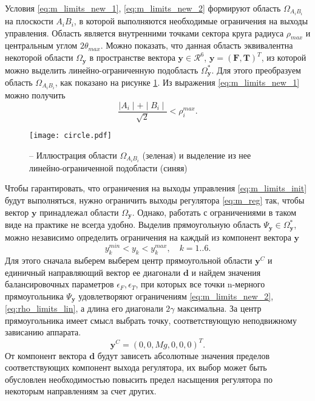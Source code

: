 Условия \eqref{eq:m_limits_new_1}, \eqref{eq:m_limits_new_2} формируют область $\Omega_{A_iB_i}$ на плоскости $A_iB_i$, в которой выполняются необходимые ограничения на выходы управления. Область является внутренними точками сектора круга радиуса $\rho_{max}$ и центральным углом $2\theta_{max}.$ Можно показать, что данная область эквивалентна некоторой области $\Omega_{\bm{y}}$ в пространстве вектора  $\bm{y} \in \mathcal{R}^6$, $\bm{y} = (\bm{F}, \bm{T})^T$, из которой можно выделить линейно-ограниченную подобласть $\Omega^*_{\bm{y}}$.
Для этого преобразуем область $\Omega_{A_iB_i}$, как показано на рисунке \ref{fig:lim_circle}. Из выражения \eqref{eq:m_limits_new_1} можно получить
\begin{equation} \label{eq:rho_limits_lin}
\frac{\mid A_i \mid + \mid B_i \mid} {\sqrt2}
< \rho_i^{max}.
\end{equation}

\begin{figure}[h!]
	\centering
	\texttt{[image: circle.pdf]}
	\caption{ -- Иллюстрация области $\Omega_{A_iB_i}$ (зеленая) и выделение из нее линейно-ограниченной подобласти (синяя)}
	\label{fig:lim_circle}
\end{figure}

Чтобы гарантировать, что ограничения на выходы управления \eqref{eq:m_limits_init} будут выполняться, нужно ограничить выходы регулятора
\eqref{eq:m_reg}
так, чтобы вектор
$\bm y$
принадлежал области
$\Omega_{\bm{y}}$.
Однако, работать с ограничениями в таком виде на практике не всегда удобно. Выделив прямоугольную область $\Psi_{\bm y} \in \Omega^*_{\bm y}$, можно независимо определить ограничения на каждый из компонент вектора $\bm y$
\begin{equation} \label{rect_in}
y_k^{min} < y_k < y_k^{max},
\quad k = 1 .. 6.
\end{equation}
Для этого сначала выберем выберем центр прямоугольной области
$\bm y^C$
и единичный направляющий вектор ее диагонали
$\bm d$
и найдем значения балансировочных параметров
$\epsilon_F, \epsilon_T$,
при которых все точки n-мерного прямоугольника
$\Psi_{\bm y}$
удовлетворяют ограничениям \eqref{eq:m_limits_new_2}, \eqref{eq:rho_limits_lin}, а длина его диагонали $2\gamma$ максимальна. За центр прямоугольника имеет смысл выбрать точку, соответствующую неподвижному зависанию аппарата. 
\begin{equation} \label{center}
\bm y^C = (0, 0, Mg, 0, 0, 0)^T.
\end{equation}
От компонент вектора $\bm d$ будут зависеть абсолютные значения пределов соответствующих компонент выхода регулятора, их выбор может быть обусловлен необходимостью повысить предел насыщения регулятора по некоторым направлениям за счет других. 

